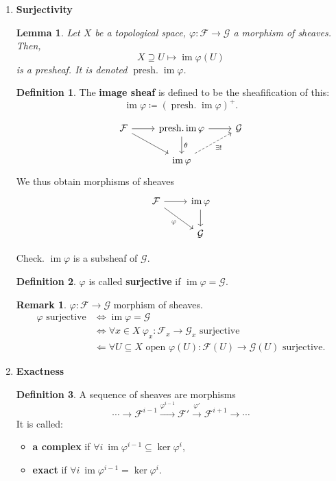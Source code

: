 \documentclass[12pt]{article}
\DeclareMathOperator{\im}{im}
\DeclareMathOperator{\presh}{presh.}
\newtheorem*{lemma}{Lemma}
\theoremstyle{definition}
\newtheorem*{definition}{Definition}
\newtheorem*{remark}{Remark}
\begin{document}
\begin{enumerate}[label=\arabic*)]
\item \textbf{Surjectivity}

\begin{lemma}
Let $X$ be a topological space, $\varphi:\mathcal F\rightarrow\mathcal G$ a morphism of sheaves. Then,
\[X\supseteq U\longmapsto\im\varphi(U)\]
is a presheaf. It is denoted $\presh\im\varphi$.
\end{lemma}

\begin{definition}
The \textbf{image sheaf} is defined to be the sheafification of this:
\[\im\varphi\coloneqq(\presh\im\varphi)^+.\]
\end{definition}

\[\begin{tikzcd}\mathcal F\arrow[r]\arrow[rd]&\presh\im\varphi\arrow[r]\arrow[d,"\theta"]&\mathcal G\\&\im\varphi\arrow[ru,dashed,"\exists!",swap]\end{tikzcd}\]
We thus obtain morphisms of sheaves
\[\begin{tikzcd}\mathcal F\arrow[r]\arrow[rd,"\varphi",swap]&\im\varphi\arrow[d]\\&\mathcal G\end{tikzcd}\]

Check. $\im\varphi$ is a subsheaf of $\mathcal G$.

\begin{definition}
$\varphi$ is called \textbf{surjective} if $\im\varphi=\mathcal G$.
\end{definition}

\begin{remark}
$\varphi:\mathcal F\rightarrow\mathcal G$ morphism of sheaves.
\begin{align*}
\varphi\text{ surjective}&\Longleftrightarrow\im\varphi=\mathcal G\\&\Longleftrightarrow\forall x\in X\ \varphi_x:\mathcal F_x\rightarrow\mathcal G_x\text{ surjective}\\&\Longleftarrow\forall U\subseteq X\text{ open }\varphi(U):\mathcal F(U)\rightarrow\mathcal G(U)\text{ surjective}.
\end{align*}
\end{remark}

\item \textbf{Exactness}

\begin{definition}
A sequence of sheaves are morphisms
\[\cdots\longrightarrow\mathcal F^{i-1}\xrightarrow{\varphi^{i-1}}\mathcal F'\overset{\varphi'}\longrightarrow\mathcal F^{i+1}\longrightarrow\cdots\]
It is called:
\begin{itemize}
\item \textbf{a complex} if $\forall i\ \im\varphi^{i-1}\subseteq\ker\varphi^i$,
\item \textbf{exact} if $\forall i\ \im\varphi^{i-1}=\ker\varphi^i$.
\end{itemize}
\end{definition}


\end{enumerate}
\end{document}
